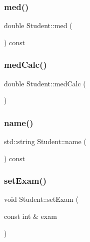 \mbox{\label{class_student_a38b3e368f66757d5ab99fea91e579024}} 
\subsubsection{\texorpdfstring{med()}{med()}}
{\footnotesize\ttfamily double Student\+::med (\begin{DoxyParamCaption}{ }\end{DoxyParamCaption}) const\hspace{0.3cm}{\ttfamily [inline]}}

\mbox{\label{class_student_a3d9abf4e847a325a49ba91e07d6f9594}} 
\subsubsection{\texorpdfstring{medCalc()}{medCalc()}}
{\footnotesize\ttfamily double Student\+::med\+Calc (\begin{DoxyParamCaption}{ }\end{DoxyParamCaption})}

\mbox{\label{class_student_a3f64726cb226017b770e4246ca19ba04}} 
\subsubsection{\texorpdfstring{name()}{name()}}
{\footnotesize\ttfamily std\+::string Student\+::name (\begin{DoxyParamCaption}{ }\end{DoxyParamCaption}) const\hspace{0.3cm}{\ttfamily [inline]}}

\mbox{\label{class_student_ae4dfc9ea1f586f44d4f748f667db9ac3}} 
\subsubsection{\texorpdfstring{setExam()}{setExam()}}
{\footnotesize\ttfamily void Student\+::set\+Exam (\begin{DoxyParamCaption}\item[{const int \&}]{exam }\end{DoxyParamCaption})\hspace{0.3cm}{\ttfamily [inline]}}

